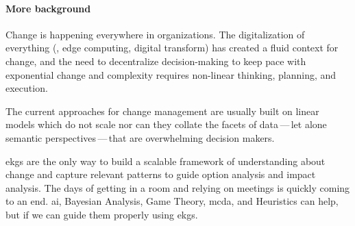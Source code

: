 %
%



\paragraph*{More background}

Change is happening everywhere in organizations.
The digitalization of everything (, edge computing,
digital transform) has created a fluid context for change,
and the need to decentralize decision-making to keep pace with exponential change and complexity
requires non-linear thinking, planning, and execution.

The current approaches for change management are usually built on linear models which do not scale nor can they collate
the facets of data\,---\,let alone semantic perspectives\,---\,that are overwhelming decision makers.

\Glspl{ekg} are the only way to build a scalable framework of understanding about change and capture relevant patterns
to guide option analysis and impact analysis.
The days of getting in a room and relying on meetings is quickly coming to an end.
\Gls{ai}, Bayesian Analysis, Game Theory, \gls{mcda},
and Heuristics can help, but  if we can guide them properly using \glspl{ekg}.

